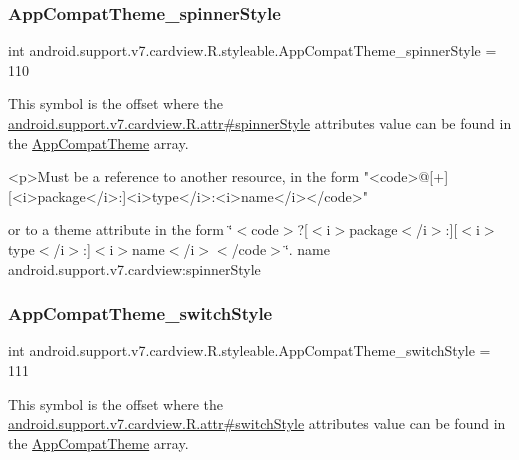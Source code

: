\subsubsection{\texorpdfstring{App\+Compat\+Theme\+\_\+spinner\+Style}{AppCompatTheme\_spinnerStyle}}
{\footnotesize\ttfamily int android.\+support.\+v7.\+cardview.\+R.\+styleable.\+App\+Compat\+Theme\+\_\+spinner\+Style = 110\hspace{0.3cm}{\ttfamily [static]}}

This symbol is the offset where the \hyperlink{classandroid_1_1support_1_1v7_1_1cardview_1_1R_1_1attr_acbf1a2eb7ad364b14112f295534337fc}{android.\+support.\+v7.\+cardview.\+R.\+attr\#spinner\+Style} attribute\textquotesingle{}s value can be found in the \hyperlink{classandroid_1_1support_1_1v7_1_1cardview_1_1R_1_1styleable_a52e6f69f954ecc2622d72c0b4d298938}{App\+Compat\+Theme} array.

\begin{DoxyVerb}      <p>Must be a reference to another resource, in the form "<code>@[+][<i>package</i>:]<i>type</i>:<i>name</i></code>"
\end{DoxyVerb}
 or to a theme attribute in the form \char`\"{}$<$code$>$?\mbox{[}$<$i$>$package$<$/i$>$\+:\mbox{]}\mbox{[}$<$i$>$type$<$/i$>$\+:\mbox{]}$<$i$>$name$<$/i$>$$<$/code$>$\char`\"{}.  name android.\+support.\+v7.\+cardview\+:spinner\+Style \mbox{\label{classandroid_1_1support_1_1v7_1_1cardview_1_1R_1_1styleable_ae03f65b3221dfdd71687a7d31d9a7103}} 
\subsubsection{\texorpdfstring{App\+Compat\+Theme\+\_\+switch\+Style}{AppCompatTheme\_switchStyle}}
{\footnotesize\ttfamily int android.\+support.\+v7.\+cardview.\+R.\+styleable.\+App\+Compat\+Theme\+\_\+switch\+Style = 111\hspace{0.3cm}{\ttfamily [static]}}

This symbol is the offset where the \hyperlink{classandroid_1_1support_1_1v7_1_1cardview_1_1R_1_1attr_aad5de7139ec7a0aaa9b3ff7a957f370e}{android.\+support.\+v7.\+cardview.\+R.\+attr\#switch\+Style} attribute\textquotesingle{}s value can be found in the \hyperlink{classandroid_1_1support_1_1v7_1_1cardview_1_1R_1_1styleable_a52e6f69f954ecc2622d72c0b4d298938}{App\+Compat\+Theme} array.

